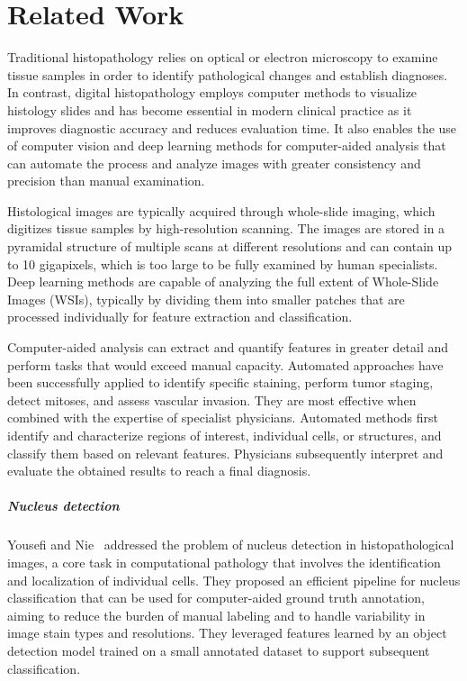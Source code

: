\chapter{Related Work}
Traditional histopathology relies on optical or electron microscopy to examine tissue samples in order to identify pathological changes and establish diagnoses. In contrast, digital histopathology employs computer methods to visualize histology slides and has become essential in modern clinical practice as it improves diagnostic accuracy and reduces evaluation time. It also enables the use of computer vision and deep learning methods for computer-aided analysis that can automate the process and analyze images with greater consistency and precision than manual examination.

Histological images are typically acquired through whole-slide imaging, which digitizes tissue samples by high-resolution scanning. The images are stored in a pyramidal structure of multiple scans at different resolutions and can contain up to 10 gigapixels, which is too large to be fully examined by human specialists. Deep learning methods are capable of analyzing the full extent of Whole-Slide Images (WSIs), typically by dividing them into smaller patches that are processed individually for feature extraction and classification.

Computer-aided analysis can extract and quantify features in greater detail and perform tasks that would exceed manual capacity. Automated approaches have been successfully applied to identify specific staining, perform tumor staging, detect mitoses, and assess vascular invasion. They are most effective when combined with the expertise of specialist physicians. Automated methods first identify and characterize regions of interest, individual cells, or structures, and classify them based on relevant features. Physicians subsequently interpret and evaluate the obtained results to reach a final diagnosis.~\cite{Moscalu2023}

\paragraph{Nucleus detection} Yousefi and Nie~\cite{Yousefi2019} addressed the problem of nucleus detection in histopathological images, a core task in computational pathology that involves the identification and localization of individual cells. They proposed an efficient pipeline for nucleus classification that can be used for computer-aided ground truth annotation, aiming to reduce the burden of manual labeling and to handle variability in image stain types and resolutions. They leveraged features learned by an object detection model trained on a small annotated dataset to support subsequent classification.

